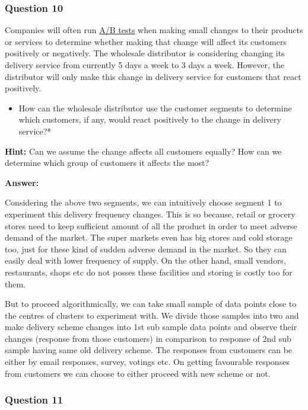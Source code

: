 \documentclass[11pt]{article}
\providecommand{\tightlist}{%
      \setlength{\itemsep}{0pt}\setlength{\parskip}{0pt}}
\begin{document}
    \hypertarget{question-10}{%
\subsubsection{Question 10}\label{question-10}}

Companies will often run
\href{https://en.wikipedia.org/wiki/A/B_testing}{A/B tests} when making
small changes to their products or services to determine whether making
that change will affect its customers positively or negatively. The
wholesale distributor is considering changing its delivery service from
currently 5 days a week to 3 days a week. However, the distributor will
only make this change in delivery service for customers that react
positively.

\begin{itemize}
\tightlist
\item
  How can the wholesale distributor use the customer segments to
  determine which customers, if any, would react positively to the
  change in delivery service?*
\end{itemize}

\textbf{Hint:} Can we assume the change affects all customers equally?
How can we determine which group of customers it affects the most?

    \textbf{Answer:}

Considering the above two segments, we can intuitively choose segment 1
to experiment this delivery frequency changes. This is so because,
retail or grocery stores need to keep sufficient amount of all the
product in order to meet adverse demand of the market. The super markets
even has big stores and cold storage too, just for these kind of sudden
adverse demand in the market. So they can easily deal with lower
frequency of supply. On the other hand, small vendors, restaurants,
shops etc do not posses these facilities and storing is costly too for
them.

But to proceed algorithmically, we can take small sample of data points
close to the centres of clusters to experiment with. We divide those
samples into two and make delivery scheme changes into 1st sub sample
data points and observe their changes (response from those customers) in
comparison to response of 2nd sub sample having same old delivery
scheme. The responses from customers can be either by email responses,
survey, votings etc. On getting favourable responses from customers we
can choose to either proceed with new scheme or not.

    \hypertarget{question-11}{%
\subsubsection{Question 11}\label{question-11}}
\end{document}
